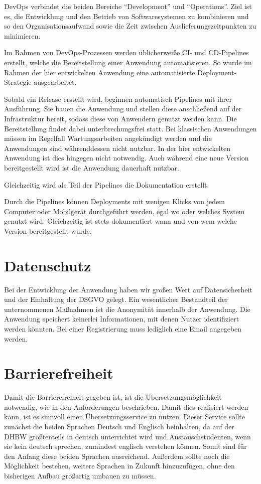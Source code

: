 DevOps verbindet die beiden Bereiche \enquote{Development} und \enquote{Operations}.
Ziel ist es, die Entwicklung und den Betrieb von Softwaresystemen zu kombinieren und so den Organisationsaufwand sowie die Zeit zwischen Auslieferungszeitpunkten zu minimieren.\autocite[][S. 156]{Artac2018}

Im Rahmen von DevOps-Prozessen werden üblicherweiße \ac{CI}- und \ac{CD}-Pipelines erstellt, welche die Bereitstellung einer Anwendung automatisieren.
So wurde im Rahmen der hier entwickelten Anwendung eine automatisierte Deployment-Strategie ausgearbeitet.

Sobald ein Release erstellt wird, beginnen automatisch Pipelines mit ihrer Ausführung. Sie bauen die Anwendung und stellen diese anschließend auf der Infrastruktur bereit, sodass diese von Anwendern genutzt werden kann.
Die Bereitstellung findet dabei unterbrechungsfrei statt.
Bei klassischen Anwendungen müssen im Regelfall Wartungsarbeiten angekündigt werden und die Anwendungen sind währenddessen nicht nutzbar.
In der hier entwickelten Anwendung ist dies hingegen nicht notwendig.
Auch während eine neue Version bereitgestellt wird ist die Anwendung dauerhaft nutzbar.

Gleichzeitig wird als Teil der Pipelines die Dokumentation erstellt.

Durch die Pipelines können Deployments mit wenigen Klicks von jedem Computer oder Mobilgerät durchgeführt werden, egal wo oder welches System genutzt wird.
Gleichzeitig ist stets dokumentiert wann und von wem welche Version bereitgestellt wurde.


\section{Datenschutz}
Bei der Entwicklung der Anwendung haben wir großen Wert auf Datensicherheit und der Einhaltung der DSGVO gelegt.
Ein wesentlicher Bestandteil der unternommenen Maßnahmen ist die Anonymität innerhalb der Anwendung.
Die Anwendung speichert keinerlei Informationen, mit denen Nutzer identifiziert werden könnten.
Bei einer Registrierung muss lediglich eine Email angegeben werden.


\section{Barrierefreiheit}

Damit die Barrierefreiheit gegeben ist, ist die Übersetzungsmöglichkeit notwendig, wie in den Anforderungen beschrieben. Damit dies 
realisiert werden kann, ist es sinnvoll einen Übersetzungsservice zu nutzen. Dieser Service sollte zunächst die beiden Sprachen Deutsch und 
Englisch beinhalten, da auf der DHBW größtenteils in deutsch unterrichtet wird und Austauschstudenten, wenn sie kein deutsch sprechen, zumindest englisch 
verstehen können. Somit sind für den Anfang diese beiden Sprachen ausreichend. Außerdem sollte noch die Möglichkeit bestehen, weitere Sprachen 
in Zukunft hinzuzufügen, ohne den bisherigen Aufbau großartig umbauen zu müssen. 


